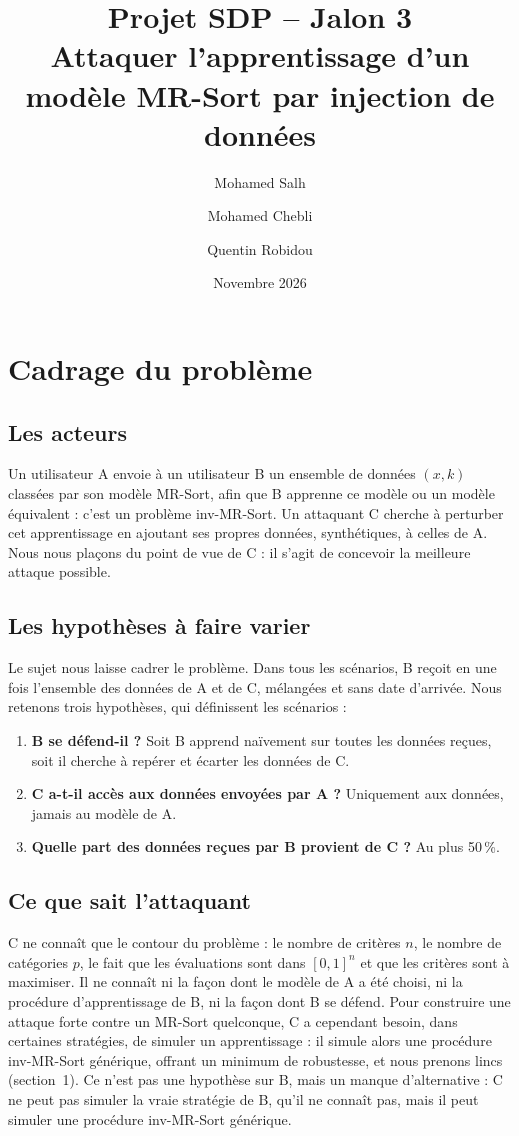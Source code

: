 \documentclass[11pt,a4paper]{article}
\title{Projet SDP -- Jalon 3\\[2pt]\large Attaquer l'apprentissage d'un modèle MR-Sort par injection de données}
\author{Mohamed Salh \and Mohamed Chebli \and Quentin Robidou}
\date{Novembre 2026}
\begin{document}
\maketitle

\setcounter{section}{-1}
\section{Cadrage du problème}

\subsection{Les acteurs}

Un utilisateur A envoie à un utilisateur B un ensemble de données $(x, k)$ classées par son modèle MR-Sort,
afin que B apprenne ce modèle ou un modèle équivalent : c'est un problème inv-MR-Sort. Un attaquant C cherche
à perturber cet apprentissage en ajoutant ses propres données, synthétiques, à celles de A. Nous nous plaçons
du point de vue de C : il s'agit de concevoir la meilleure attaque possible.

\subsection{Les hypothèses à faire varier}

Le sujet nous laisse cadrer le problème. Dans tous les scénarios, B reçoit en une fois l'ensemble des données de
A et de C, mélangées et sans date d'arrivée. Nous retenons trois hypothèses, qui définissent les scénarios :
\begin{enumerate}
  \item \textbf{B se défend-il ?} Soit B apprend naïvement sur toutes les données reçues, soit il cherche à
        repérer et écarter les données de C.
  \item \textbf{C a-t-il accès aux données envoyées par A ?} Uniquement aux données, jamais au modèle de A.
  \item \textbf{Quelle part des données reçues par B provient de C ?} Au plus 50\,\%.
\end{enumerate}

\subsection{Ce que sait l'attaquant}

C ne connaît que le contour du problème : le nombre de critères $n$, le nombre de catégories $p$, le fait que
les évaluations sont dans $[0,1]^n$ et que les critères sont à maximiser. Il ne connaît ni la façon dont le
modèle de A a été choisi, ni la procédure d'apprentissage de B, ni la façon dont B se défend. Pour construire
une attaque forte contre un MR-Sort quelconque, C a cependant besoin, dans certaines stratégies, de simuler un
apprentissage : il simule alors une procédure inv-MR-Sort générique, offrant un minimum de robustesse, et nous
prenons lincs (section~1). Ce n'est pas une hypothèse sur B, mais un manque d'alternative : C ne peut pas
simuler la vraie stratégie de B, qu'il ne connaît pas, mais il peut simuler une procédure inv-MR-Sort générique.
\end{document}
